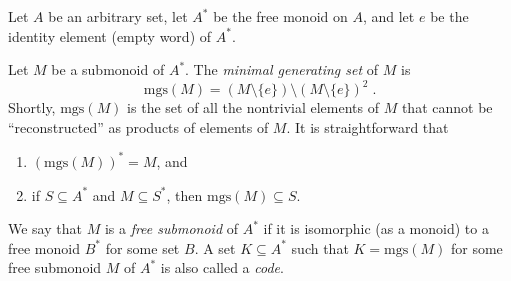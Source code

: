 \documentclass[12pt]{article}
\begin{document}
\newcommand{\mgs}{\ensuremath{\mathrm{mgs}}}

Let $A$ be an arbitrary set,
let $A^\ast$ be the free monoid on $A$,
and let $e$ be the identity element (empty word) of $A^\ast$.

Let $M$ be a submonoid of $A^\ast$.
The \emph{minimal generating set} of $M$ is
\begin{equation} \label{eq:mgs}
\mgs(M) = (M\setminus\{e\})\setminus(M\setminus\{e\})^2\;.
\end{equation}
Shortly, $\mgs(M)$ is the set of all the nontrivial elements of $M$
that cannot be ``reconstructed'' as products of elements of $M$.
It is straightforward that
\begin{enumerate}
\item $(\mgs(M))^\ast=M$, and
\item if $S\subseteq A^\ast$ and $M\subseteq S^\ast$,
then $\mgs(M)\subseteq S$.
\end{enumerate}
We say that $M$ is a \emph{free submonoid} of $A^\ast$
if it is isomorphic (as a monoid)
to a free monoid $B^\ast$ for some set $B$.
A set $K\subseteq A^\ast$ such that $K=\mgs(M)$
for some free submonoid $M$ of $A^\ast$
is also called a \emph{code}.

\end{document}
